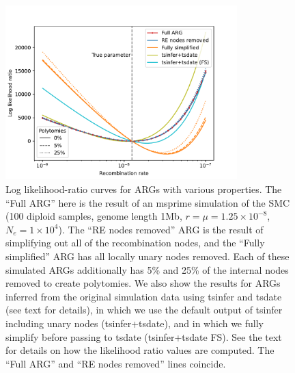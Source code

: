 \documentclass{article}
\begin{document}
\begin{figure}
    \centering
    \includegraphics[width=0.8\textwidth]{figures/likelihood_surface}
    \caption{Log likelihood-ratio curves for ARGs with various properties.
    The ``Full ARG'' here is the result of an
    msprime simulation of the SMC (100 diploid samples, genome length 1Mb,
    $r=\mu=1.25\times10^{-8}$, $N_e=1\times10^4$).
    The ``RE nodes removed'' ARG is the
    result of simplifying out all of the recombination nodes,
    and the ``Fully simplified'' ARG has all locally unary nodes removed.
    Each of these simulated ARGs additionally has 5\% and 25\% of the
    internal nodes removed to create polytomies.
    We also show the results for ARGs inferred from the original simulation
    data using tsinfer and tsdate
    (see text for details), in which we use the default output of tsinfer
    including unary nodes (tsinfer+tsdate), and in which we fully simplify
    before passing to tsdate (tsinfer+tsdate FS).
    See the text for details on how the likelihood ratio
    values are computed.
    The ``Full ARG'' and ``RE nodes removed'' lines coincide.
    \label{fig:lik-surface}}
\end{figure}
\end{document}
